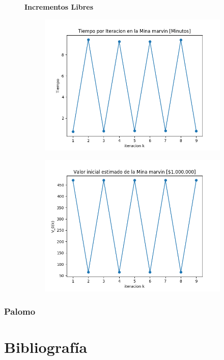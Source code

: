 \documentclass[12pt,letterpaper]{article}
\begin{document}
\begin{figure}[H]
  \captionsetup[subfigure]{labelformat=empty}
  \centering
  \textbf{Incrementos Libres}
  
  \begin{subfigure}[b]{0.4\textwidth}
     \includegraphics[width=\textwidth]{Graficos/FiltradosCauchyLibre/marvinml_inc_times..png}
     \caption{}
     \label{fig:ex1}
  \end{subfigure}
  \begin{subfigure}[b]{0.4\textwidth}
     \includegraphics[width=\textwidth]{Graficos/FiltradosCauchyLibre/marvinml_inc_v_k..png}
     \caption{}
     \label{fig:ex2}
  \end{subfigure}
\end{figure}

\subsubsection{Palomo}

\section{Bibliografía}
\end{document}
